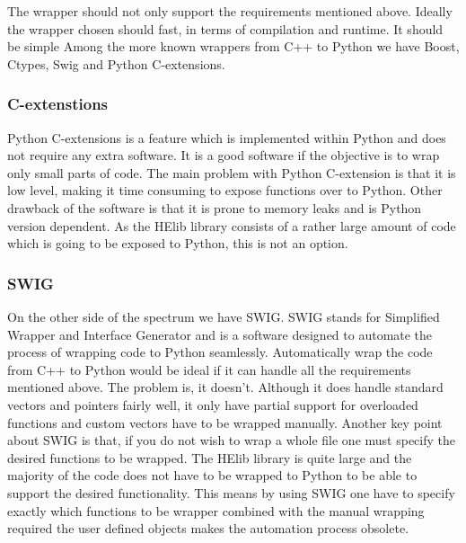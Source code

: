 The wrapper should not only support the requirements mentioned above. Ideally the wrapper chosen should fast, in terms of compilation and runtime. It should be simple Among the more known wrappers from C++ to Python we have Boost, Ctypes, Swig and Python C-extensions.

\subsubsection{C-extenstions}
Python C-extensions is a feature which is implemented within Python and does not require any extra software. It is a good software if the objective is to wrap only small parts of code. The main problem with Python C-extension is that it is low level, making it time consuming to expose functions over to Python. Other drawback of the software is that it is prone to memory leaks and is Python version dependent. As the HElib library consists of a rather large amount of code which is going to be exposed to Python, this is not an option.

\subsubsection{SWIG}
On the other side of the spectrum we have SWIG. SWIG stands for Simplified Wrapper and Interface Generator and is a software designed to automate the process of wrapping code to Python seamlessly. Automatically wrap the code from C++ to Python would be ideal if it can handle all the requirements mentioned above. The problem is, it doesn't. Although it does handle standard vectors and pointers fairly well, it only have partial support for overloaded functions and custom vectors have to be wrapped manually. Another key point about SWIG is that, if you do not wish to wrap a whole file one must specify the desired functions to be wrapped. The HElib library is quite large and the majority of the code does not have to be wrapped to Python to be able to support the desired functionality. This means by using SWIG one have to specify exactly which functions to be wrapper combined with the manual wrapping required the user defined objects makes the automation process obsolete.

\newpage

